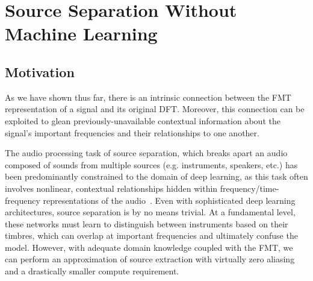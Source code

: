 \documentclass[11pt,twoside]{report}
\numberwithin{thm}{section}
\numberwithin{equation}{section}
\begin{document}


\section{Source Separation Without Machine Learning}
\subsection{Motivation}
As we have shown thus far, there is an intrinsic connection between the FMT representation of a signal and its original DFT. Moreover, this connection can be exploited to glean previously-unavailable contextual information about the signal's important frequencies and their relationships to one another.

The audio processing task of source separation, which breaks apart an audio composed of sounds from multiple sources (e.g. instruments, speakers, etc.) has been predominantly constrained to the domain of deep learning, as this task often involves nonlinear, contextual relationships hidden within frequency/time-frequency representations of the audio~\cite{ANSARI2023126895}. Even with sophisticated deep learning architectures, source separation is by no means trivial. At a fundamental level, these networks must learn to distinguish between instruments based on their timbres, which can overlap at important frequencies and ultimately confuse the model. However, with adequate domain knowledge coupled with the FMT, we can perform an approximation of source extraction with virtually zero aliasing and a drastically smaller compute requirement. 
\end{document}
